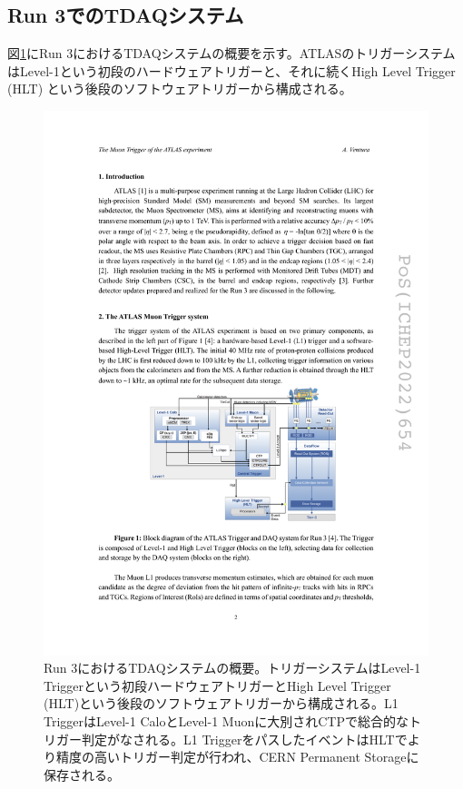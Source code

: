     \subsection{Run 3でのTDAQシステム}
    \label{subsec_run3TDAQ}
    図\ref{Run3_TDAQ}にRun 3におけるTDAQシステムの概要を示す。ATLASのトリガーシステムはLevel-1という初段のハードウェアトリガーと、それに続くHigh Level Trigger (HLT) という後段のソフトウェアトリガーから構成される。

    \begin{figure} 
    \centering
    \includegraphics[width=16cm]{fig/Intro/Run3_TDAQ.pdf}
    \caption[Run 3におけるTDAQシステムの概要]{Run 3におけるTDAQシステムの概要\cite{Run3_TDAQ}。トリガーシステムはLevel-1 Triggerという初段ハードウェアトリガーとHigh Level Trigger (HLT)という後段のソフトウェアトリガーから構成される。L1 TriggerはLevel-1 CaloとLevel-1 Muonに大別されCTPで総合的なトリガー判定がなされる。L1 TriggerをパスしたイベントはHLTでより精度の高いトリガー判定が行われ、CERN Permanent Storageに保存される。 }
    \label{Run3_TDAQ}
    \end{figure}


